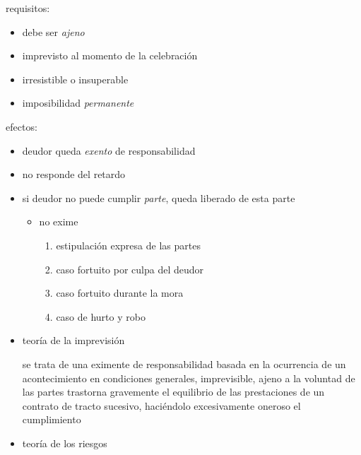 \documentclass[]{article}
\providecommand{\tightlist}{%
  \setlength{\itemsep}{0pt}\setlength{\parskip}{0pt}}
\begin{document}
\begin{itemize}
\begin{itemize}
\begin{itemize}
\begin{itemize}
        requisitos:

        \begin{itemize}
        \tightlist
        \item
          debe ser \emph{ajeno}
        \item
          imprevisto al momento de la celebración
        \item
          irresistible o insuperable
        \item
          imposibilidad \emph{permanente}
        \end{itemize}

        efectos:

        \begin{itemize}
        \item
          deudor queda \emph{exento} de responsabilidad
        \item
          no responde del retardo
        \item
          si deudor no puede cumplir \emph{parte}, queda liberado de
          esta parte

          \begin{itemize}
          \tightlist
          \item
            no exime

            \begin{enumerate}
            \def\labelenumi{\arabic{enumi}.}
            \tightlist
            \item
              estipulación expresa de las partes
            \item
              caso fortuito por culpa del deudor
            \item
              caso fortuito durante la mora
            \item
              caso de hurto y robo
            \end{enumerate}
          \end{itemize}
        \item
          teoría de la imprevisión

          se trata de una eximente de responsabilidad basada en la
          ocurrencia de un acontecimiento en condiciones generales,
          imprevisible, ajeno a la voluntad de las partes trastorna
          gravemente el equilibrio de las prestaciones de un contrato de
          tracto sucesivo, haciéndolo excesivamente oneroso el
          cumplimiento
        \item
          teoría de los riesgos


\end{itemize}
\end{itemize}
\end{itemize}
\end{itemize}
\end{itemize}
\end{document}
